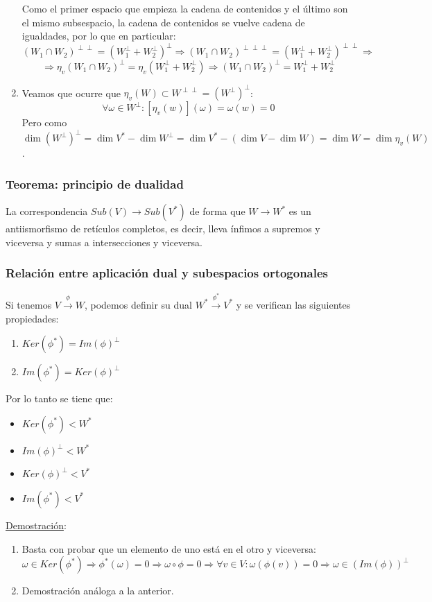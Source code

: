 \documentclass[10pt,a4paper,openright]{book}
\begin{document}
\begin{enumerate}
Como el primer espacio que empieza la cadena de contenidos y el último son el mismo subsespacio, la cadena de contenidos se vuelve cadena de igualdades, por lo que en particular:
$$(W_1\cap W_2)^{\perp\perp} = (W_1^\perp+W_2^\perp)^\perp\Rightarrow (W_1\cap W_2)^{\perp\perp\perp} = (W_1^\perp+W_2^\perp)^{\perp\perp}\Rightarrow$$
$$\Rightarrow \eta_v(W_1\cap W_2)^\perp = \eta_v(W_1^\perp+W_2^\perp)\Rightarrow (W_1\cap W_2)^\perp = W_1^\perp+W_2^\perp$$

\item Veamos que ocurre que $\eta_v(W)\subset W^{\perp\perp} = (W^\perp)^\perp$:
$$\forall \omega \in W^{\perp}: \left[\eta_v(w)\right](\omega) = \omega(w) = 0$$
Pero como $\dim (W^{\perp})^\perp = \dim V^*-\dim W^\perp =\dim V^*-( \dim V- \dim W)= \dim W = \dim \eta_v(W)$.
\end{enumerate}

\subsubsection*{Teorema: principio de dualidad}
La correspondencia $Sub(V)\rightarrow Sub(V^*)$ de forma que $W\rightarrow W^*$ es un antiismorfismo de retículos completos, es decir, lleva ínfimos a supremos y viceversa y sumas a intersecciones y viceversa.

\subsubsection*{Relación entre aplicación dual y subespacios ortogonales}
Si tenemos $V\xrightarrow{\phi} W$, podemos definir su dual $W^*\xrightarrow{\phi^*}V^*$ y se verifican las siguientes propiedades:
\begin{enumerate}
\item $Ker(\phi^*)=Im(\phi)^\perp$
\item $Im(\phi^*)=Ker(\phi)^\perp$
\end{enumerate}

Por lo tanto se tiene que:
\begin{itemize}
\item $Ker(\phi^*)< W^*$
\item $Im(\phi)^\perp < W^*$
\item $Ker(\phi)^\perp < V^*$
\item $Im(\phi^*) < V^*$
\end{itemize}

\underline{Demostración}:
\begin{enumerate}
\item Basta con probar que un elemento de uno está en el otro y viceversa:
$$\omega \in Ker(\phi^*)\Rightarrow \phi^*(\omega)=0\Rightarrow \omega \circ \phi = 0\Rightarrow \forall v\in V: \omega(\phi(v))=0\Rightarrow \omega \in (Im(\phi))^\perp$$
\item Demostración análoga a la anterior.
\end{enumerate}
\end{document}
